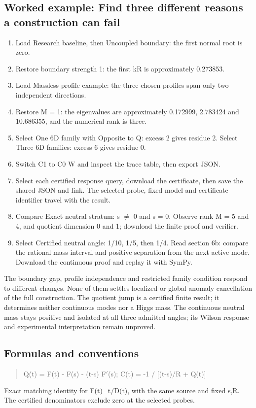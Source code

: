 \documentclass[11pt,a4paper]{article}
\begin{document}
\subsection*{Worked example: Find three different reasons a construction can fail}
\begin{enumerate}
\item Load Research baseline, then Uncoupled boundary: the first normal root is zero.
\item Restore boundary strength 1: the first kR is approximately 0.273853.
\item Load Massless profile example: the three chosen profiles span only two independent directions.
\item Restore M = 1: the eigenvalues are approximately 0.172999, 2.783424 and 10.686355, and the numerical rank is three.
\item Select One 6D family with Opposite to Q: excess 2 gives residue 2. Select Three 6D families: excess 6 gives residue 0.
\item Switch C1 to C0 W and inspect the trace table, then export JSON.
\item Select each certified response query, download the certificate, then save the shared JSON and link. The selected probe, fixed model and certificate identifier travel with the result.
\item Compare Exact neutral stratum: s \ensuremath{\neq} 0 and s = 0. Observe rank M = 5 and 4, and quotient dimension 0 and 1; download the finite proof and verifier.
\item Select Certified neutral angle: 1/10, 1/5, then 1/4. Read section 6b: compare the rational mass interval and positive separation from the next active mode. Download the continuous proof and replay it with SymPy.
\end{enumerate}
The boundary gap, profile independence and restricted family condition respond to different changes. None of them settles localized or global anomaly cancellation of the full construction. The quotient jump is a certified finite result; it determines neither continuous modes nor a Higgs mass. The continuous neutral mass stays positive and isolated at all three admitted angles; its Wilson response and experimental interpretation remain unproved.
\subsection*{Formulas and conventions}
\begin{quote}Q(t) = F(t) - F(s) - (t-s) F\ensuremath{\prime}(s); C(t) = -1 / [(t-s)/R + Q(t)]\end{quote}
Exact matching identity for F(t)=t/D(t), with the same source and fixed s,R. The certified denominators exclude zero at the selected probes.
\end{document}
